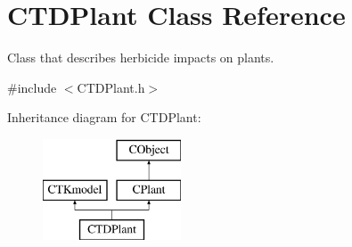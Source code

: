 \hypertarget{class_c_t_d_plant}{}\section{C\+T\+D\+Plant Class Reference}
\label{class_c_t_d_plant}


Class that describes herbicide impacts on plants.  




{\ttfamily \#include $<$C\+T\+D\+Plant.\+h$>$}

Inheritance diagram for C\+T\+D\+Plant\+:\begin{figure}[H]
\begin{center}
\leavevmode
\includegraphics[height=3.000000cm]{class_c_t_d_plant}
\end{center}
\end{figure}
